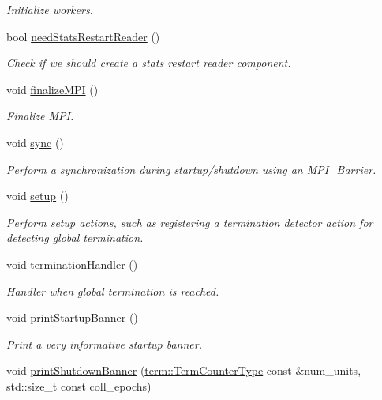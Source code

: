\begin{DoxyCompactItemize}
\begin{DoxyCompactList}\small\item\em Initialize workers. \end{DoxyCompactList}\item 
bool \hyperlink{structvt_1_1runtime_1_1_runtime_a2c4ba18d500526776e4e0d1fcde215eb}{need\+Stats\+Restart\+Reader} ()
\begin{DoxyCompactList}\small\item\em Check if we should create a stats restart reader component. \end{DoxyCompactList}\item 
void \hyperlink{structvt_1_1runtime_1_1_runtime_a59253ce5795516e46ee6549ca165f5ca}{finalize\+M\+PI} ()
\begin{DoxyCompactList}\small\item\em Finalize M\+PI. \end{DoxyCompactList}\item 
void \hyperlink{structvt_1_1runtime_1_1_runtime_a92fe07cb78904559dfc21de68018fb53}{sync} ()
\begin{DoxyCompactList}\small\item\em Perform a synchronization during startup/shutdown using an {\ttfamily M\+P\+I\+\_\+\+Barrier}. \end{DoxyCompactList}\item 
void \hyperlink{structvt_1_1runtime_1_1_runtime_a1c4fda11afb43bb2607cd1f00686550c}{setup} ()
\begin{DoxyCompactList}\small\item\em Perform setup actions, such as registering a termination detector action for detecting global termination. \end{DoxyCompactList}\item 
void \hyperlink{structvt_1_1runtime_1_1_runtime_a2d12f2a97d99585ef8e89cda0ed48972}{termination\+Handler} ()
\begin{DoxyCompactList}\small\item\em Handler when global termination is reached. \end{DoxyCompactList}\item 
void \hyperlink{structvt_1_1runtime_1_1_runtime_add9fabaf1c2f47ebf9c662f4b5f5931f}{print\+Startup\+Banner} ()
\begin{DoxyCompactList}\small\item\em Print a very informative startup banner. \end{DoxyCompactList}\item 
void \hyperlink{structvt_1_1runtime_1_1_runtime_a04efbdc6b8826e2c885987279a4762f1}{print\+Shutdown\+Banner} (\hyperlink{namespacevt_1_1term_a4fd378cdb0c36683afc1b3399d685f7f}{term\+::\+Term\+Counter\+Type} const \&num\+\_\+units, std\+::size\+\_\+t const coll\+\_\+epochs)

\end{DoxyCompactItemize}

